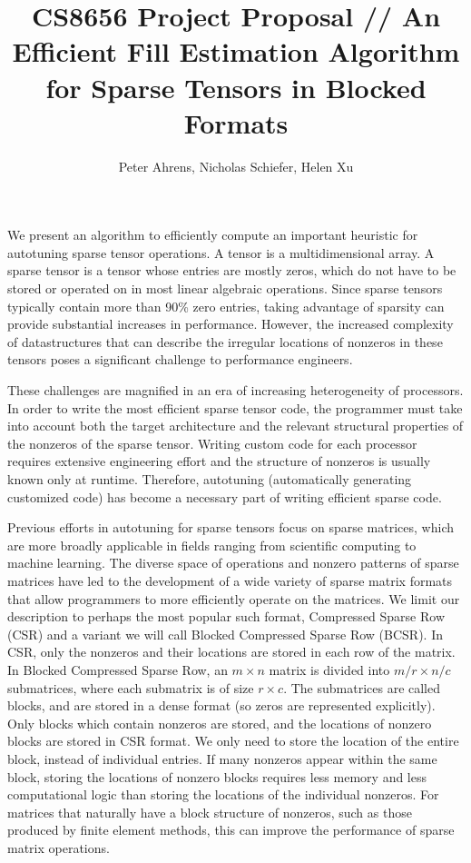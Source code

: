 \documentclass[12pt]{article}
\title{CS8656 Project Proposal // An Efficient Fill Estimation Algorithm for Sparse Tensors in Blocked Formats}
\author{Peter Ahrens, Nicholas Schiefer, Helen Xu}
\date{}
\theoremstyle{dfn}
\numberwithin{equation}{section}
\numberwithin{figure}{section}
\begin{document}
  \maketitle

  We present an algorithm to efficiently compute an important heuristic for autotuning sparse tensor operations. A tensor is a multidimensional array. A sparse tensor is a tensor whose entries are mostly zeros, which do not have to be stored or operated on in most linear algebraic operations. Since sparse tensors typically contain more than 90\% zero entries, taking advantage of sparsity can provide substantial increases in performance. However, the increased complexity of datastructures that can describe the irregular locations of nonzeros in these tensors poses a significant challenge to performance engineers.

  These challenges are magnified in an era of increasing heterogeneity of processors. In order to write the most efficient sparse tensor code, the programmer must take into account both the target architecture and the relevant structural properties of the nonzeros of the sparse tensor. Writing custom code for each processor requires extensive engineering effort and the structure of nonzeros is usually known only at runtime. Therefore, autotuning (automatically generating customized code) has become a necessary part of writing efficient sparse code.

  Previous efforts in autotuning for sparse tensors focus on sparse matrices, which are more broadly applicable in fields ranging from scientific computing to machine learning. The diverse space of operations and nonzero patterns of sparse matrices have led to the development of a wide variety of sparse matrix formats that allow programmers to more efficiently operate on the matrices. We limit our description to perhaps the most popular such format, Compressed Sparse Row (CSR) and a variant we will call Blocked Compressed Sparse Row (BCSR). In CSR, only the nonzeros and their locations are stored in each row of the matrix. In Blocked Compressed Sparse Row, an $m \times n$ matrix is divided into $m/r \times n/c$ submatrices, where each submatrix is of size $r \times c$. The submatrices are called blocks, and are stored in a dense format (so zeros are represented explicitly). Only blocks which contain nonzeros are stored, and the locations of nonzero blocks are stored in CSR format. We only need to store the location of the entire block, instead of individual entries. If many nonzeros appear within the same block, storing the locations of nonzero blocks requires less memory and less computational logic than storing the locations of the individual nonzeros. For matrices that naturally have a block structure of nonzeros, such as those produced by finite element methods, this can improve the performance of sparse matrix operations.
\end{document}
